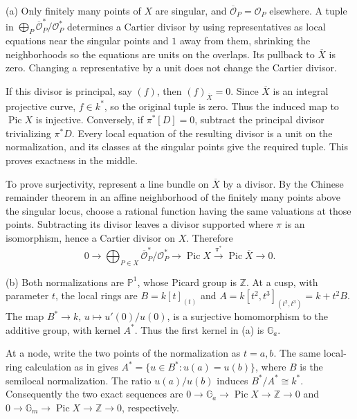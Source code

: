 (a) Only finitely many points of $X$ are singular, and $\overline{\mathcal O}_P=\mathcal O_P$ elsewhere. A tuple in $\bigoplus_P\overline{\mathcal O}_P^*/\mathcal O_P^*$ determines a Cartier divisor by using representatives as local equations near the singular points and $1$ away from them, shrinking the neighborhoods so the equations are units on the overlaps. Its pullback to $\overline X$ is zero. Changing a representative by a unit does not change the Cartier divisor.

If this divisor is principal, say $(f)$, then $(f)_{\overline X}=0$. Since $\overline X$ is an integral projective curve, $f\in k^*$, so the original tuple is zero. Thus the induced map to $\operatorname{Pic}X$ is injective. Conversely, if $\pi^*[D]=0$, subtract the principal divisor trivializing $\pi^*D$. Every local equation of the resulting divisor is a unit on the normalization, and its classes at the singular points give the required tuple. This proves exactness in the middle.

To prove surjectivity, represent a line bundle on $\overline X$ by a divisor. By the Chinese remainder theorem in an affine neighborhood of the finitely many points above the singular locus, choose a rational function having the same valuations at those points. Subtracting its divisor leaves a divisor supported where $\pi$ is an isomorphism, hence a Cartier divisor on $X$. Therefore
\[0\to\bigoplus_{P\in X}\overline{\mathcal O}_P^*/\mathcal O_P^*\to\operatorname{Pic}X\xrightarrow{\pi^*}\operatorname{Pic}\overline X\to0.\]

(b) Both normalizations are $\mathbb P^1$, whose Picard group is $\mathbb Z$. At a cusp, with parameter $t$, the local rings are $B=k[t]_{(t)}$ and $A=k[t^2,t^3]_{(t^2,t^3)}=k+t^2B$. The map $B^*\to k$, $u\mapsto u'(0)/u(0)$, is a surjective homomorphism to the additive group, with kernel $A^*$. Thus the first kernel in (a) is $\mathbb G_a$.

At a node, write the two points of the normalization as $t=a,b$. The same local-ring calculation as in  gives $A^*=\{u\in B^*:u(a)=u(b)\}$, where $B$ is the semilocal normalization. The ratio $u(a)/u(b)$ induces $B^*/A^*\cong k^*$. Consequently the two exact sequences are $0\to\mathbb G_a\to\operatorname{Pic}X\to\mathbb Z\to0$ and $0\to\mathbb G_m\to\operatorname{Pic}X\to\mathbb Z\to0$, respectively.
